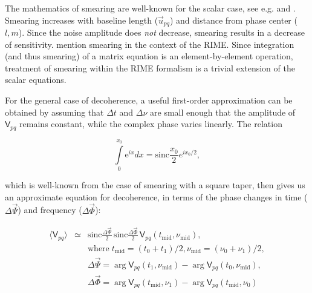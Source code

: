 \documentclass{aa}
\newcommand{\coh}[2]{\mathsf{{#1}}_{{#2}}}
\begin{document}
The mathematics of smearing are well-known for the scalar case, see e.g. \citet[Sect.~6.4]{tms} and \citet{Bridle:smearing}. Smearing increases with baseline length ($\vec u_{pq}$) and distance from phase center ($l,m$). Since the noise amplitude does {\em not} decrease, smearing results in a decrease of sensitivity. \citet{ME1} mention smearing in the context of the RIME. Since integration (and thus smearing) of a matrix equation is an element-by-element operation,  treatment of smearing within the RIME formalism is a trivial extension of the scalar equations.

For the general case of decoherence, a useful first-order approximation can be obtained by assuming that $\Delta t$ and $\Delta\nu$ are small enough that the amplitude of $\coh{V}{pq}$ remains constant, while the complex phase varies linearly. The relation

\[
\int\limits_{0}^{x_0}\mathrm{e}^{ix}dx = \mathrm{sinc}\frac{x_0}{2}e^{ix_0/2},
\]

which is well-known from the case of smearing with a square taper, then gives us an approximate equation for decoherence, in terms of the phase changes in time ($\Delta\vec\Psi$) and frequency ($\Delta\vec\Phi$):

\begin{eqnarray}\label{eq:smearing}
\langle \coh{V}{pq} \rangle & \simeq & \mathrm{sinc}\frac{\Delta\vec\Psi}{2}\,\mathrm{sinc}\frac{\Delta\vec\Phi}{2}\,\coh{V}{pq}(t_\mathrm{mid},\nu_\mathrm{mid}), \\
\nonumber && \mathrm{where} \; t_\mathrm{mid} = (t_0+t_1)/2, \nu_\mathrm{mid} = (\nu_0+\nu_1)/2, \\
\nonumber && \Delta\vec\Psi = \arg \coh{V}{pq}(t_1,\nu_\mathrm{mid}) - \arg \coh{V}{pq}(t_0,\nu_\mathrm{mid}), \\
\nonumber && \Delta\vec\Phi = \arg \coh{V}{pq}(t_\mathrm{mid},\nu_1) - \arg \coh{V}{pq}(t_\mathrm{mid},\nu_0) 
\end{eqnarray}
\end{document}
